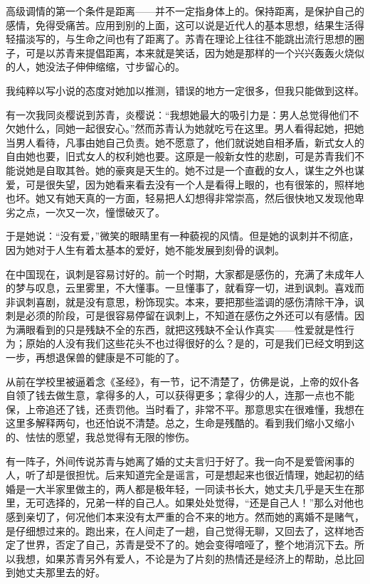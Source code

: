 \par 高级调情的第一个条件是距离——并不一定指身体上的。保持距离，是保护自己的感情，免得受痛苦。应用到别的上面，这可以说是近代人的基本思想，结果生活得轻描淡写的，与生命之间也有了距离了。苏青在理论上往往不能跳出流行思想的圈子，可是以苏青来提倡距离，本来就是笑话，因为她是那样的一个兴兴轰轰火烧似的人，她没法子伸伸缩缩，寸步留心的。
\par 我纯粹以写小说的态度对她加以推测，错误的地方一定很多，但我只能做到这样。
\par 有一次我同炎樱说到苏青，炎樱说：“我想她最大的吸引力是：男人总觉得他们不欠她什么，同她一起很安心。”然而苏青认为她就吃亏在这里。男人看得起她，把她当男人看待，凡事由她自己负责。她不愿意了，他们就说她自相矛盾，新式女人的自由她也要，旧式女人的权利她也要。这原是一般新女性的悲剧，可是苏青我们不能说她是自取其咎。她的豪爽是天生的。她不过是一个直截的女人，谋生之外也谋爱，可是很失望，因为她看来看去没有一个人是看得上眼的，也有很笨的，照样地也坏。她又有她天真的一方面，轻易把人幻想得非常崇高，然后很快地又发现他卑劣之点，一次又一次，憧憬破灭了。
\par 于是她说：“没有爱，”微笑的眼睛里有一种藐视的风情。但是她的讽刺并不彻底，因为她对于人生有着太基本的爱好，她不能发展到刻骨的讽刺。
\par 在中国现在，讽刺是容易讨好的。前一个时期，大家都是感伤的，充满了未成年人的梦与叹息，云里雾里，不大懂事。一旦懂事了，就看穿一切，进到讽刺。喜戏而非讽刺喜剧，就是没有意思，粉饰现实。本来，要把那些滥调的感伤清除干净，讽刺是必须的阶段，可是很容易停留在讽刺上，不知道在感伤之外还可以有感情。因为满眼看到的只是残缺不全的东西，就把这残缺不全认作真实——性爱就是性行为；原始的人没有我们这些花头不也过得很好的么？是的，可是我们已经文明到这一步，再想退保兽的健康是不可能的了。
\par 从前在学校里被逼着念《圣经》，有一节，记不清楚了，仿佛是说，上帝的奴仆各自领了钱去做生意，拿得多的人，可以获得更多；拿得少的人，连那一点也不能保，上帝追还了钱，还责罚他。当时看了，非常不平。那意思实在很难懂，我想在这里多解释两句，也还怕说不清楚。总之，生命是残酷的。看到我们缩小又缩小的、怯怯的愿望，我总觉得有无限的惨伤。
\par 有一阵子，外间传说苏青与她离了婚的丈夫言归于好了。我一向不是爱管闲事的人，听了却是很担忧。后来知道完全是谣言，可是想起来也很近情理，她起初的结婚是一大半家里做主的，两人都是极年轻，一同读书长大，她丈夫几乎是天生在那里，无可选择的，兄弟一样的自己人。如果处处觉得，“还是自己人！”那么对他也感到亲切了，何况他们本来没有太严重的合不来的地方。然而她的离婚不是赌气，是仔细想过来的。跑出来，在人间走了一趟，自己觉得无聊，又回去了，这样地否定了世界，否定了自己，苏青是受不了的。她会变得喑哑了，整个地消沉下去。所以我想，如果苏青另外有爱人，不论是为了片刻的热情还是经济上的帮助，总比回到她丈夫那里去的好。
